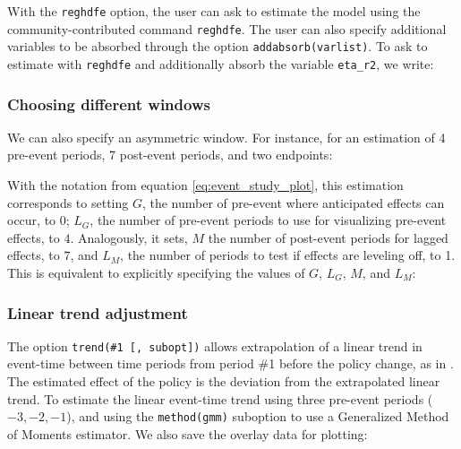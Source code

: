 \documentclass[bib]{./sty/statapress}
\begin{document}
With the \texttt{reghdfe} option, the user can ask \xtevent to estimate the model using the community-contributed command \texttt{reghdfe}.
The user can also specify additional variables to be absorbed through the option \texttt{addabsorb(varlist)}.
To ask \xtevent to estimate with \texttt{reghdfe} and additionally absorb the variable \texttt{eta\_r2}, we write:

\begin{stlog}
\nullskip
\end{stlog}

\subsubsection*{Choosing different windows}

We can also specify an asymmetric window.
For instance, for an estimation of 4 pre-event periods, 7 post-event periods, and two endpoints:

\begin{stlog}
\nullskip
\end{stlog}

With the notation from equation \eqref{eq:event_study_plot}, this estimation corresponds to setting $G$, the number of pre-event where anticipated effects can occur, to 0; $L_G$, the number of pre-event periods to use for visualizing pre-event effects, to $4$.
Analogously, it sets, $M$ the number of post-event periods for lagged effects, to $7$, and $L_M$, the number of periods to test if effects are leveling off, to 1.
This is equivalent to explicitly specifying the values of $G$, $L_G$, $M$, and $L_M$:

\begin{stlog}
\nullskip
\end{stlog}

\subsubsection*{Linear trend adjustment}

The option \texttt{trend(\#1 [, subopt])} allows extrapolation of a linear trend in event-time between time periods from period \#1 before the policy change, as in \citet{dobkin2018economic}.
The estimated effect of the policy is the deviation from the extrapolated linear trend.
To estimate the linear event-time trend using three pre-event periods ($-3, -2,-1$), and using the \texttt{method(gmm)} suboption to use a Generalized Method of Moments estimator. 
We also save the overlay data for plotting:
\end{document}
